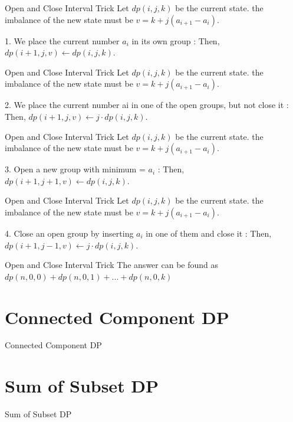 \documentclass[aspectratio=169,xcolor=dvipsnames]{beamer}
\begin{document}
\begin{frame}[plain, t]{Open and Close Interval Trick}
Let $dp(i, j, k)$ be the current state. the imbalance of the new state must be $v = k + j(a_{i+1} - a_i)$.

1. We place the current number $a_i$ in its own group : Then, $dp(i+1, j, v) \leftarrow dp(i, j, k)$.
\end{frame}
\begin{frame}[plain, t]{Open and Close Interval Trick}
Let $dp(i, j, k)$ be the current state. the imbalance of the new state must be $v = k + j(a_{i+1} - a_i)$.

2. We place the current number ai in one of the open groups, but not close it : Then, $dp(i+1, j, v) \leftarrow j \cdot dp(i, j, k)$.
\end{frame}
\begin{frame}[plain, t]{Open and Close Interval Trick}
Let $dp(i, j, k)$ be the current state. the imbalance of the new state must be $v = k + j(a_{i+1} - a_i)$.

3. Open a new group with minimum = $a_i$ : Then, $dp(i+1, j+1, v) \leftarrow dp(i, j, k)$.
\end{frame}
\begin{frame}[plain, t]{Open and Close Interval Trick}
Let $dp(i, j, k)$ be the current state. the imbalance of the new state must be $v = k + j(a_{i+1} - a_i)$.

4. Close an open group by inserting $a_i$ in one of them and close it : Then, $dp(i+1, j-1, v) \leftarrow j \cdot dp(i, j, k)$.
\end{frame}

\begin{frame}[plain, t]{Open and Close Interval Trick}
The answer can be found as $dp(n, 0, 0) + dp(n, 0, 1) + ... + dp(n, 0, k)$
\end{frame}
\section{Connected Component DP}
\begin{frame}[plain]{Connected Component DP}
\end{frame}
\section{Sum of Subset DP}
\begin{frame}[plain]{Sum of Subset DP}
\end{frame}
\end{document}
